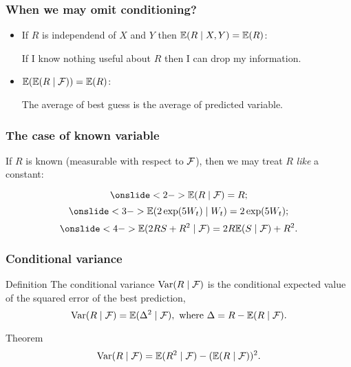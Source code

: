 \begin{frame}
    \frametitle{When we may omit conditioning?}

    \begin{itemize}[<+->]

        \item If $R$ is \alert{independend} of $X$ and $Y$ then $\mathbb{E}(R \mid X, Y) = \mathbb{E}(R)$:

        If I know \alert{nothing useful} about $R$ then I can drop my information. 

        \item $\mathbb{E}( \mathbb{E}( R \mid \mathcal{F}) ) = \mathbb{E}(R)$:
        
        The \alert{average of best guess} is the average of predicted variable. 

    \end{itemize}

\end{frame}




\begin{frame}
    \frametitle{The case of known variable}

    If $R$ is \alert{known} (measurable with respect to $\mathcal{F}$), 
    then we may treat $R$ \textit{like} a constant:

    \[
        \onslide<2->{\E(R \mid \cF ) = R;}
    \]
    \[
        \onslide<3->{\E(2\exp(5W_t) \mid W_t) = 2\exp(5W_t);}
    \]
    \[
        \onslide<4->{\E(2R S + R^2 \mid \cF ) = 2R \E(S\mid \cF) + R^2.}
    \]


\end{frame}


\begin{frame}
    \frametitle{Conditional variance}

    \begin{block}{Definition \formalduck}
        The \alert{conditional variance} $\operatorname{Var}(R \mid \mathcal{F})$ is the conditional expected value of the 
        squared error of the best prediction,
        \pause
        \[
            \operatorname{Var}(R \mid \mathcal{F}) = \mathbb{E}(\Delta^2 \mid \mathcal{F}), \text{ where } \Delta = R - \mathbb{E}(R \mid \mathcal{F}).
        \]
    \end{block}

    \pause 
    \begin{block}{Theorem \formalduck}
        \[
            \operatorname{Var}(R \mid \mathcal{F}) = \mathbb{E}(R^2 \mid \mathcal{F}) - (\mathbb{E}(R \mid \mathcal{F}) )^2.
        \]
    \end{block}
\end{frame}




